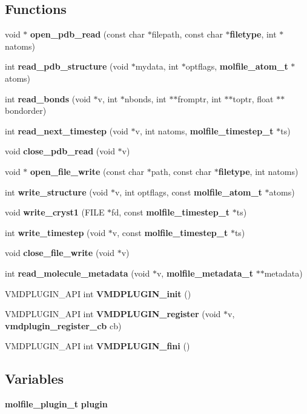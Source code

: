 \subsection*{Functions}
\begin{CompactItemize}
\item 
void $\ast$ {\bf open\_\-pdb\_\-read} (const char $\ast$filepath, const char $\ast${\bf filetype}, int $\ast$natoms)
\item 
int {\bf read\_\-pdb\_\-structure} (void $\ast$mydata, int $\ast$optflags, {\bf molfile\_\-atom\_\-t} $\ast$atoms)
\item 
int {\bf read\_\-bonds} (void $\ast$v, int $\ast$nbonds, int $\ast$$\ast$fromptr, int $\ast$$\ast$toptr, float $\ast$$\ast$bondorder)
\item 
int {\bf read\_\-next\_\-timestep} (void $\ast$v, int natoms, {\bf molfile\_\-timestep\_\-t} $\ast$ts)
\item 
void {\bf close\_\-pdb\_\-read} (void $\ast$v)
\item 
void $\ast$ {\bf open\_\-file\_\-write} (const char $\ast$path, const char $\ast${\bf filetype}, int natoms)
\item 
int {\bf write\_\-structure} (void $\ast$v, int optflags, const {\bf molfile\_\-atom\_\-t} $\ast$atoms)
\item 
void {\bf write\_\-cryst1} (FILE $\ast$fd, const {\bf molfile\_\-timestep\_\-t} $\ast$ts)
\item 
int {\bf write\_\-timestep} (void $\ast$v, const {\bf molfile\_\-timestep\_\-t} $\ast$ts)
\item 
void {\bf close\_\-file\_\-write} (void $\ast$v)
\item 
int {\bf read\_\-molecule\_\-metadata} (void $\ast$v, {\bf molfile\_\-metadata\_\-t} $\ast$$\ast$metadata)
\item 
VMDPLUGIN\_\-API int {\bf VMDPLUGIN\_\-init} ()
\item 
VMDPLUGIN\_\-API int {\bf VMDPLUGIN\_\-register} (void $\ast$v, {\bf vmdplugin\_\-register\_\-cb} cb)
\item 
VMDPLUGIN\_\-API int {\bf VMDPLUGIN\_\-fini} ()
\end{CompactItemize}
\subsection*{Variables}
\begin{CompactItemize}
\item 
{\bf molfile\_\-plugin\_\-t} {\bf plugin}
\end{CompactItemize}


